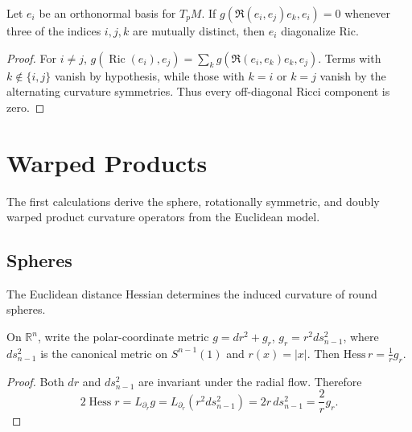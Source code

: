 \begin{proposition}
  \label{prop:pet-ch4-ricci-diagonal-criterion}


  Let $e_i$ be an orthonormal basis for $T_pM$. If $g(\mathfrak{R}(e_i,e_j)e_k,e_i)=0$
  whenever three of the indices $i,j,k$ are mutually distinct, then $e_i$
  diagonalize $\mathrm{Ric}$.
\end{proposition}
\begin{proof}

  \sketch
  For $i\ne j$,
  $g(\operatorname{Ric}(e_i),e_j)=\sum_k g(\mathfrak R(e_i,e_k)e_k,e_j)$.
  Terms with $k\notin\{i,j\}$ vanish by hypothesis, while those with $k=i$ or
  $k=j$ vanish by the alternating curvature symmetries. Thus every off-diagonal
  Ricci component is zero.
\end{proof}

\section{Warped Products}

The first calculations derive the sphere, rotationally symmetric, and doubly warped
product curvature operators from the Euclidean model.

\subsection{Spheres}

The Euclidean distance Hessian determines the induced curvature of round spheres.

\begin{proposition}
  \label{prop:pet-ch4-hess-r-euclidean}

  On $\mathbb{R}^n$, write the polar-coordinate metric $g=dr^2+g_r$, $g_r=r^2ds_{n-1}^2$,
  where $ds_{n-1}^2$ is the canonical metric on $S^{n-1}(1)$ and $r(x)=|x|$. Then
  $\mathrm{Hess}\,r=\tfrac1r g_r$.
\end{proposition}
\begin{proof}
  \sketch
  Both $dr$ and $ds_{n-1}^2$ are invariant under the radial flow. Therefore
  \[
    2\operatorname{Hess}r=L_{\partial_r}g
    =L_{\partial_r}(r^2ds_{n-1}^2)
    =2r\,ds_{n-1}^2=\frac2r g_r.
  \]
\end{proof}

